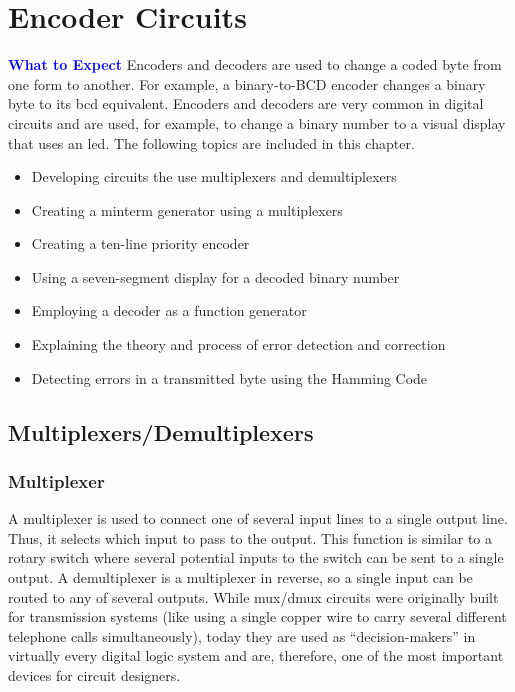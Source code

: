 \chapter{Encoder Circuits}\label{ch09}

\begin{tcolorbox}[colback=blue!5!white,colframe=blue!75!black]
	\textcolor{blue}{\textbf{What to Expect}}
	\tcblower
	Encoders and decoders are used to change a coded byte from one form to another. For example, a binary-to-BCD encoder changes a binary byte to its \gls{bcd} equivalent. Encoders and decoders are very common in digital circuits and are used, for example, to change a binary number to a visual display that uses an \gls{led}. The following topics are included in this chapter.
	
	\begin{itemize}
		\item Developing circuits the use multiplexers and demultiplexers
		\item Creating a minterm generator using a multiplexers
		\item Creating a ten-line priority encoder
		\item Using a seven-segment display for a decoded binary number
		\item Employing a decoder as a function generator
		\item Explaining the theory and process of error detection and correction
		\item Detecting errors in a transmitted byte using the Hamming Code
	\end{itemize}
	
\end{tcolorbox}

\section{Multiplexers/Demultiplexers}
\label{CL:sec:multiplexers_demultiplexers}

\subsection{Multiplexer}
\label{CL:subsec:multiplexer}


A multiplexer is used to connect one of several input lines to a single output line. Thus, it selects which input to pass to the output. This function is similar to a rotary switch where several potential inputs to the switch can be sent to a single output. A demultiplexer is a multiplexer in reverse, so a single input can be routed to any of several outputs. While mux/dmux circuits were originally built for transmission systems (like using a single copper wire to carry several different telephone calls simultaneously), today they are used as ``decision-makers'' in virtually every digital logic system and are, therefore, one of the most important devices for circuit designers. 

